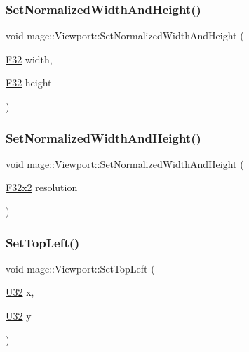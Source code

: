 \subsubsection{\texorpdfstring{Set\+Normalized\+Width\+And\+Height()}{SetNormalizedWidthAndHeight()}\hspace{0.1cm}{\footnotesize\ttfamily [3/4]}}
{\footnotesize\ttfamily void mage\+::\+Viewport\+::\+Set\+Normalized\+Width\+And\+Height (\begin{DoxyParamCaption}\item[{\hyperlink{namespacemage_aa97e833b45f06d60a0a9c4fc22ae02c0}{F32}}]{width,  }\item[{\hyperlink{namespacemage_aa97e833b45f06d60a0a9c4fc22ae02c0}{F32}}]{height }\end{DoxyParamCaption})\hspace{0.3cm}{\ttfamily [noexcept]}}

\hypertarget{classmage_1_1_viewport_a0d905e73b96493184393b107b5545ae3}{}\label{classmage_1_1_viewport_a0d905e73b96493184393b107b5545ae3} 
\subsubsection{\texorpdfstring{Set\+Normalized\+Width\+And\+Height()}{SetNormalizedWidthAndHeight()}\hspace{0.1cm}{\footnotesize\ttfamily [4/4]}}
{\footnotesize\ttfamily void mage\+::\+Viewport\+::\+Set\+Normalized\+Width\+And\+Height (\begin{DoxyParamCaption}\item[{\hyperlink{namespacemage_aa87237ad091f5cd7da612b8523fc108f}{F32x2}}]{resolution }\end{DoxyParamCaption})\hspace{0.3cm}{\ttfamily [noexcept]}}

\hypertarget{classmage_1_1_viewport_a14f63922d0bd2613b3fc2b86683f13a7}{}\label{classmage_1_1_viewport_a14f63922d0bd2613b3fc2b86683f13a7} 
\subsubsection{\texorpdfstring{Set\+Top\+Left()}{SetTopLeft()}\hspace{0.1cm}{\footnotesize\ttfamily [1/4]}}
{\footnotesize\ttfamily void mage\+::\+Viewport\+::\+Set\+Top\+Left (\begin{DoxyParamCaption}\item[{\hyperlink{namespacemage_a41c104c036fba3756a74e19f793eeaa1}{U32}}]{x,  }\item[{\hyperlink{namespacemage_a41c104c036fba3756a74e19f793eeaa1}{U32}}]{y }\end{DoxyParamCaption})\hspace{0.3cm}{\ttfamily [noexcept]}}

